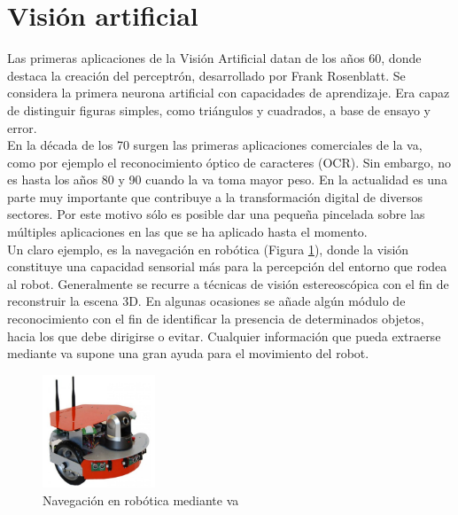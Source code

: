 \section{Visión artificial}

Las primeras aplicaciones de la Visión Artificial datan de los años 60, donde destaca la creación del perceptrón, desarrollado por Frank Rosenblatt. Se considera la primera neurona artificial con capacidades de aprendizaje. Era capaz de distinguir figuras simples, como triángulos y cuadrados, a base de ensayo y error.\\

En la década de los 70 surgen las primeras aplicaciones comerciales de la \acrshort{va}, como por ejemplo el reconocimiento óptico de caracteres (OCR). Sin embargo, no es hasta los años 80 y 90 cuando la \acrshort{va} toma mayor peso. En la actualidad es una parte muy importante que contribuye a la transformación digital de diversos sectores. Por este motivo sólo es posible dar una pequeña pincelada sobre las múltiples aplicaciones en las que se ha aplicado hasta el momento.\\

Un claro ejemplo, es la navegación en robótica (Figura \ref{fig.robot}), donde la visión constituye una capacidad sensorial más para la percepción del entorno que rodea al robot. Generalmente se recurre a técnicas de visión estereoscópica con el fin de reconstruir la escena 3D. En algunas ocasiones se añade algún módulo de reconocimiento con el fin de identificar la presencia de determinados objetos, hacia los que debe dirigirse o evitar. Cualquier información que pueda extraerse mediante \acrshort{va} supone una gran ayuda para el movimiento del robot. \\

\begin{figure}[H]
  \begin{center}
    \includegraphics[width=0.3\textwidth]{figures/Introduccion/robot.jpg}
		\caption{Navegación en robótica mediante \acrshort{va}}
		\label{fig.robot}
		\end{center}
\end{figure}


